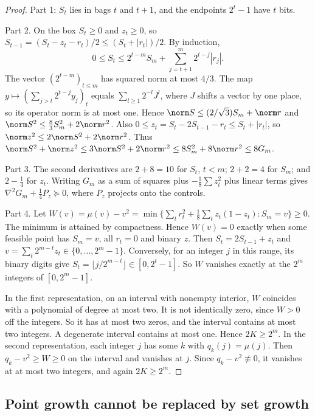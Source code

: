 \begin{proof}
Part 1: $S_t$ lies in bags $t$ and $t+1$, and the endpoints $2^t-1$ have
$t$ bits.

Part 2. On the box $S_t\ge0$ and $z_t\ge0$, so
$S_{t-1}=(S_t-z_t-r_t)/2\le(S_t+|r_t|)/2$. By induction,
\[
0\le S_t\le2^{t-m}S_m+\sum_{j=t+1}^m2^{t-j}|r_j| .
\]
The vector $(2^{t-m})_{t\le m}$ has squared norm at most $4/3$. The map
$y\mapsto(\sum_{j>t}2^{t-j}y_j)_t$ equals $\sum_{l\ge1}2^{-l}J^l$, where $J$
shifts a vector by one place, so its operator norm is at most one. Hence $\norm S\le(2/\sqrt3)S_m+\norm r$ and
$\norm S^2\le\frac83S_m^2+2\norm r^2$. Also
$0\le z_t=S_t-2S_{t-1}-r_t\le S_t+|r_t|$, so
$\norm z^2\le2\norm S^2+2\norm r^2$. Thus
$\norm S^2+\norm z^2\le3\norm S^2+2\norm r^2\le8S_m^2+8\norm r^2\le8G_m$.

Part 3. The second derivatives are $2+8=10$ for $S_t$, $t<m$; $2+2=4$ for
$S_m$; and $2-\frac14$ for $z_t$. Writing $G_m$ as a sum of squares plus
$-\frac18\sum z_t^2$ plus linear terms gives $\nabla^2G_m+\frac14P_z\succeq0$,
where $P_z$ projects onto the controls.

Part 4. Let $W(v)=\mu(v)-v^2
=\min\{\sum_tr_t^2+\frac18\sum_tz_t(1-z_t):S_m=v\}\ge0$. The minimum is
attained by compactness. Hence $W(v)=0$ exactly when some feasible point has
$S_m=v$, all $r_t=0$ and binary $z$. Then $S_t=2S_{t-1}+z_t$ and
$v=\sum_t2^{m-t}z_t\in\{0,\ldots,2^m-1\}$. Conversely, for an integer $j$ in
this range, its binary digits give $S_t=\lfloor j/2^{m-t}\rfloor\in
[0,2^t-1]$. So $W$ vanishes exactly at the $2^m$ integers of
$[0,2^m-1]$.

In the first representation, on an interval with nonempty interior,
$W$ coincides with a polynomial of degree at most two. It is not
identically zero, since $W>0$ off the integers. So it has at most two zeros,
and the interval contains at most two integers. A degenerate interval
contains at most one. Hence $2K\ge2^m$. In the second representation, each
integer $j$ has some $k$ with $q_k(j)=\mu(j)$. Then $q_k-v^2\ge W\ge0$ on the
interval and vanishes at $j$. Since $q_k-v^2\not\equiv0$, it vanishes at at
most two integers, and again $2K\ge2^m$.
\end{proof}

\subsection{Point growth cannot be replaced by set growth}
\label{sec:limits-setgrowth}


